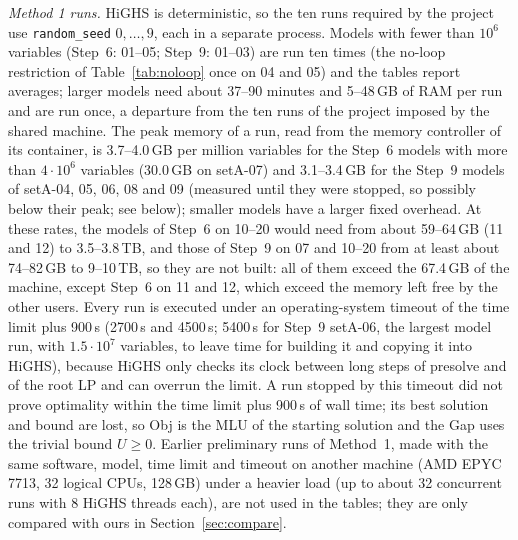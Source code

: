 \documentclass[conference]{IEEEtran}
\begin{document}
\emph{Method 1 runs.} HiGHS is deterministic, so the ten runs required by the project use \texttt{random\_seed} $0,\dots,9$, each in a separate process. Models with fewer than $10^6$ variables (Step~6: 01--05; Step~9: 01--03) are run ten times (the no-loop restriction of Table~\ref{tab:noloop} once on 04 and 05) and the tables report averages; larger models need about 37--90 minutes and 5--48\,GB of RAM per run and are run once, a departure from the ten runs of the project imposed by the shared machine. The peak memory of a run, read from the memory controller of its container, is 3.7--4.0\,GB per million variables for the Step~6 models with more than $4\cdot10^6$ variables (30.0\,GB on setA-07) and 3.1--3.4\,GB for the Step~9 models of setA-04, 05, 06, 08 and 09 (measured until they were stopped, so possibly below their peak; see below); smaller models have a larger fixed overhead. At these rates, the models of Step~6 on 10--20 would need from about 59--64\,GB (11 and 12) to 3.5--3.8\,TB, and those of Step~9 on 07 and 10--20 from at least about 74--82\,GB to 9--10\,TB, so they are not built: all of them exceed the 67.4\,GB of the machine, except Step~6 on 11 and 12, which exceed the memory left free by the other users. Every run is executed under an operating-system timeout of the time limit plus 900\,s (2700\,s and 4500\,s; 5400\,s for Step~9 setA-06, the largest model run, with $1.5\cdot10^7$ variables, to leave time for building it and copying it into HiGHS), because HiGHS only checks its clock between long steps of presolve and of the root LP and can overrun the limit. A run stopped by this timeout did not prove optimality within the time limit plus 900\,s of wall time; its best solution and bound are lost, so Obj is the MLU of the starting solution and the Gap uses the trivial bound $U\ge0$. Earlier preliminary runs of Method~1, made with the same software, model, time limit and timeout on another machine (AMD EPYC 7713, 32 logical CPUs, 128\,GB) under a heavier load (up to about 32 concurrent runs with 8 HiGHS threads each), are not used in the tables; they are only compared with ours in Section~\ref{sec:compare}.
\end{document}
